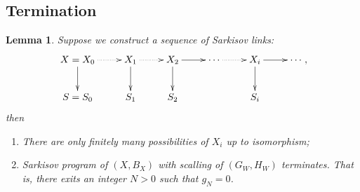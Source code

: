 \documentclass{article}
\newtheorem{lem}[defn]{Lemma}
\begin{document}
\subsection{Termination}
\begin{lem}\label{termination2}
Suppose  we  construct a sequence of Sarkisov links: 
\[
  \xymatrix{
    X=X_0\ar@{.>}[r]\ar[d]&X_{1}\ar@{.>}[r]\ar[d]& X_{2}\ar[d]\ar[r] &\cdots\ar@{.>}[r]&X_{i}\ar[d] \ar[r] &\cdots\\
    S=S_{0}&S_{1} &S_{2}&&S_{i}
  }
,\]
then
  \begin{enumerate}
    \item There are only finitely many possibilities of $X_{i}$ up to isomorphism;

    \item Sarkisov program of $(X,B_{X})$ with scalling of $(G_{W},H_{W})$ terminates. That is, there exits an integer $N>0$ such that $g_{N}=0$.  
  \end{enumerate}
\end{lem}
\end{document}
